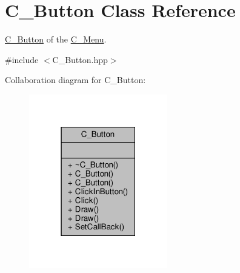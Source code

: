 \hypertarget{classC__Button}{}\section{C\+\_\+\+Button Class Reference}
\label{classC__Button}


\hyperlink{classC__Button}{C\+\_\+\+Button} of the \hyperlink{classC__Menu}{C\+\_\+\+Menu}.  




{\ttfamily \#include $<$C\+\_\+\+Button.\+hpp$>$}



Collaboration diagram for C\+\_\+\+Button\+:
\nopagebreak
\begin{figure}[H]
\begin{center}
\leavevmode
\includegraphics[width=171pt]{classC__Button__coll__graph}
\end{center}
\end{figure}
